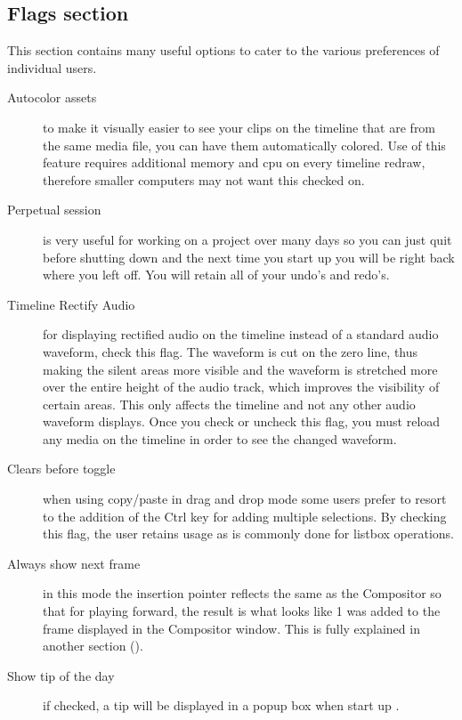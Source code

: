 \subsection{Flags section}%
\label{sub:flags_section}

This section contains many useful options to cater to the various preferences of individual users.

\begin{description}   
    \item[Autocolor assets]  to make it visually easier to see your clips on the timeline that are from the same media file, you can have them automatically colored. Use of this feature requires additional memory and cpu on every timeline redraw, therefore smaller computers may not want this checked on.
    \item[Perpetual session]  is very useful for working on a project over many days so you can just quit before
    shutting down and the next time you start up \CGG{} you will be right back where you left off. You
    will retain all of your undo's and redo's.
    \item[Timeline Rectify Audio]  for displaying rectified audio on the timeline instead of a standard audio waveform, check this flag.  The waveform is cut on the zero line, thus making the silent areas more visible and the waveform is stretched more over the entire height of the audio track, which improves the visibility of certain areas. This only affects the timeline and not any other audio waveform displays.
Once you check or uncheck this flag, you must reload any media on the timeline
in order to see the changed waveform.
    \item[Clears before toggle]  when using copy/paste in drag and drop mode some users prefer to resort to the addition of the Ctrl key for adding multiple selections.  By checking this flag, the user retains usage as is commonly done for listbox operations.
    \item[Always show next frame]  in this mode the insertion pointer reflects the same as the Compositor so that for playing forward, the result is what looks like 1 was added to the frame displayed in the Compositor window.  This is fully explained in another section ().
    \item[Show tip of the day] if checked, a tip will be displayed in a popup box when start up \CGG{}.

\end{description}
